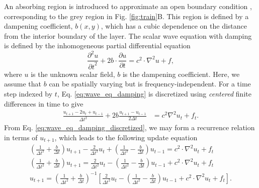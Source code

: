 

An absorbing region is introduced to approximate an open boundary condition \cite{oskooi_failure_2008}, corresponding to the grey region in Fig. \ref{fig:train}B. 
This region is defined by a dampening coefficient, $b{(x,y)}$, which has a cubic dependence on the distance from the interior boundary of the layer.
The scalar wave equation with damping is defined by the inhomogeneous partial differential equation \cite{elmore_physics_2012}
\begin{equation}
    \frac{\partial^2{u}}{{\partial{t}}^2} +  2 b \cdot \frac{\partial{u}}{{\partial{t}}} = c^2 \cdot \nabla^2 u + f,
    \label{eq:wave_eq_damping}
\end{equation}
where $u$ is the unknown scalar field, $b$ is the dampening coefficient. Here, we assume that $b$ can be spatially varying but is frequency-independent.
For a time step indexed by $t$, Eq. \ref{eq:wave_eq_damping} is discretized using \textit{centered} finite differences in time to give
\begin{align}
    \frac{u_{t+1} - 2u_t + u_{t-1}}{\Delta{t}^2} + 2b \frac{u_{t+1}-u_{t-1}}{2\Delta{t}} &= c^2 \nabla^2 u_t + f_t.
    \label{eq:wave_eq_damping_discretized}
\end{align}
From Eq. \ref{eq:wave_eq_damping_discretized}, we may form a recurrence relation in terms of $u_{t+1}$, which leads to the following update equation
\begin{align}
    \left( \frac{1}{\Delta{t}^2} + \frac{b}{\Delta{t}}\right) u_{t+1} - \frac{2}{\Delta{t}^2} u_t  + \left( \frac{1}{\Delta{t}^2} - \frac{b}{\Delta{t}} \right) u_{t-1} = c^2 \cdot \nabla^2 u_t + f_t \nonumber \\
    \left( \frac{1}{\Delta{t}^2} + \frac{b}{\Delta{t}}\right) u_{t+1} = \frac{2}{\Delta{t}^2} u_t  - \left( \frac{1}{\Delta{t}^2} - \frac{b}{\Delta{t}} \right) u_{t-1} + c^2 \cdot\nabla^2 u_t + f_t \nonumber \\
    u_{t+1} = \left( \frac{1}{\Delta{t}^2} + \frac{b}{\Delta{t}}\right)^{-1} \left[ \frac{2}{\Delta{t}^2} u_t - \left( \frac{1}{\Delta{t}^2} - \frac{b}{\Delta{t}} \right) u_{t-1} + c^2\cdot \nabla^2 u_t + f_t \right].
    \label{eq:tmp1}
\end{align}
